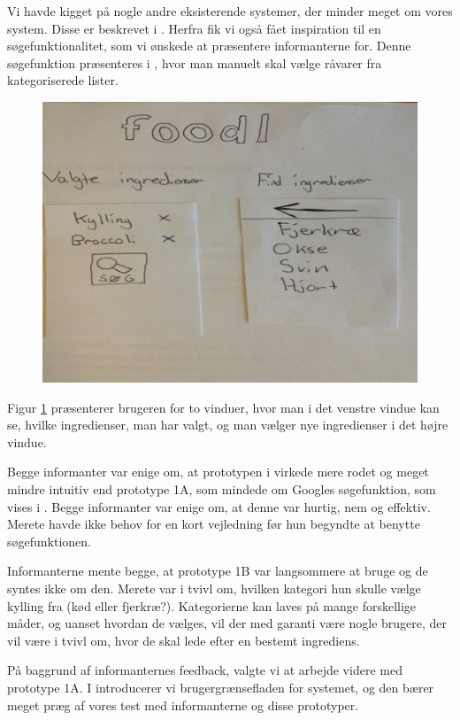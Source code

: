 Vi havde kigget på nogle andre eksisterende systemer, der minder meget om vores system. Disse er beskrevet i . Herfra fik vi også fået inspiration til en søgefunktionalitet, som vi ønskede at præsentere informanterne for. Denne søgefunktion præsenteres i , hvor man manuelt skal vælge råvarer fra kategoriserede lister.

\begin{figure}[H]
	\centering
	\includegraphics[scale=0.7]{billeder/prototyper/prototype1b.png}
	\label{fig:prototype1bdesign}
\end{figure}

Figur \ref{fig:prototype1bdesign} præsenterer brugeren for to vinduer, hvor man i det venstre vindue kan se, hvilke ingredienser, man har valgt, og man vælger nye ingredienser i det højre vindue.

Begge informanter var enige om, at prototypen i  virkede mere rodet og meget mindre intuitiv end prototype 1A, som mindede om Googles søgefunktion, som vises i . Begge informanter var enige om, at denne var hurtig, nem og effektiv. Merete havde ikke behov for en kort vejledning før hun begyndte at benytte søgefunktionen.

Informanterne mente begge, at prototype 1B var langsommere at bruge og de syntes ikke om den. Merete var i tvivl om, hvilken kategori hun skulle vælge \fx kylling fra (\fx kød eller fjerkræ?). Kategorierne kan laves på mange forskellige måder, og uanset hvordan de vælges, vil der med garanti være nogle brugere, der vil være i tvivl om, hvor de skal lede efter en bestemt ingrediens.

På baggrund af informanternes feedback, valgte vi at arbejde videre med prototype 1A. I  introducerer vi brugergrænsefladen for systemet, og den bærer meget præg af vores test med informanterne og disse prototyper.